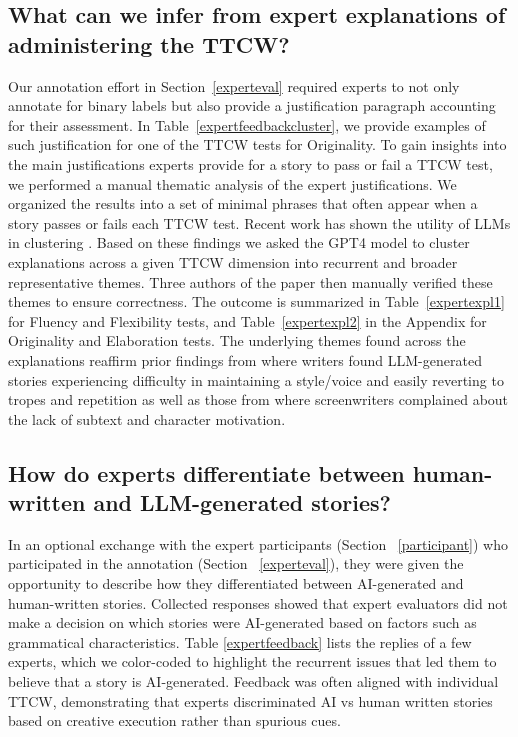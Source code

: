 \subsection{What can we infer from expert explanations of administering the TTCW?} \label{sec:analysis}



Our annotation effort in Section~\ref{experteval} required experts to not only annotate for binary labels but also provide a justification paragraph accounting for their assessment. In Table~\ref{expertfeedbackcluster}, we provide examples of such justification for one of the TTCW tests for Originality. To gain insights into the main justifications experts provide for a story to pass or fail a TTCW test, we performed a manual thematic analysis of the expert justifications. We organized the results into a set of minimal phrases that often appear when a story passes or fails each TTCW test. Recent work has shown the utility of LLMs in clustering \cite{viswanathan2023large}. Based on these findings we asked the GPT4 model to cluster explanations across a given TTCW dimension into recurrent and broader representative themes. Three authors of the paper then manually verified these themes to ensure correctness. The outcome is summarized in Table~\ref{expertexpl1} for Fluency and Flexibility tests, and Table~\ref{expertexpl2} in the Appendix for Originality and Elaboration tests. The underlying themes found across the explanations reaffirm prior findings from \citet{ippolito2022creative} where writers found LLM-generated stories experiencing difficulty in maintaining a style/voice and easily reverting to tropes and repetition as well as those from \citet{mirowski2023cowriting} where screenwriters complained about the lack of subtext and character motivation.




\subsection{How do experts differentiate between human-written and LLM-generated stories?}
\label{expertvsai}

In an optional exchange with the expert participants (Section ~\ref{participant}) who participated in the annotation (Section ~\ref{experteval}), they were given the opportunity to describe how they differentiated between AI-generated and human-written stories. Collected responses showed that expert evaluators did not make a decision on which stories were AI-generated based on factors such as grammatical characteristics. Table \ref{expertfeedback} lists the replies of a few experts, which we color-coded to highlight the recurrent issues that led them to believe that a story is AI-generated. Feedback was often aligned with individual TTCW, demonstrating that experts discriminated AI vs human written stories based on creative execution rather than spurious cues.

